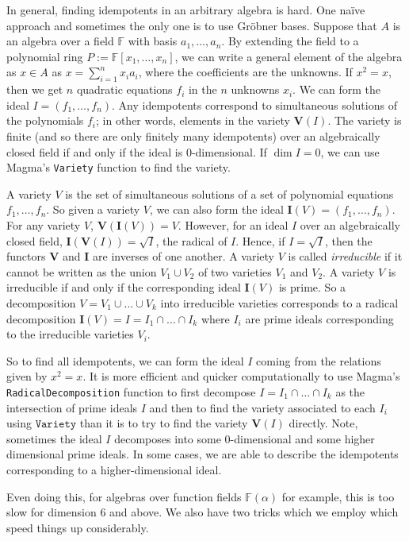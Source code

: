 \documentclass[11pt, a4paper]{article}
\theoremstyle{plain}
\theoremstyle{definition}
\newcommand\al{\alpha}
\newcommand\FF{\mathbb{F}}
\newcommand{\0}{\overline{0}}
\newcommand{\2}{\overline{2}}
\newcommand{\1}{\mathbbm{1}}
\newcommand{\V}{\mathbf{V}}
\newcommand{\I}{\mathbf{I}}
\begin{document}
In general, finding idempotents in an arbitrary algebra is hard.  One na\"ive approach and sometimes the only one is to use Gr\"obner bases.  Suppose that $A$ is an algebra over a field $\FF$ with basis $a_1, \dots, a_n$.  By extending the field to a polynomial ring $P := \FF[x_1, \dots, x_n]$, we can write a general element of the algebra as $x \in A$ as $x = \sum_{i=1}^n x_i a_i$, where the coefficients are the unknowns.  If $x^2 = x$, then we get $n$ quadratic equations $f_i$ in the $n$ unknowns $x_i$.  We can form the ideal $I = (f_1, \dots, f_n)$.  Any idempotents correspond to simultaneous solutions of the polynomials $f_i$; in other words, elements in the variety $\V(I)$.  The variety is finite (and so there are only finitely many idempotents) over an algebraically closed field if and only if the ideal is $0$-dimensional.  If $\dim I = 0$, we can use Magma's \texttt{Variety} function to find the variety.

A variety $V$ is the set of simultaneous solutions of a set of polynomial equations $f_1, \dots, f_n$.  So given a variety $V$, we can also form the ideal $\I(V) = (f_1, \dots, f_n)$.  For any variety $V$, $\V(\I(V)) = V$.  However, for an ideal $I$ over an algebraically closed field, $\I(\V(I)) = \sqrt{I}$, the radical of $I$.  Hence, if $I = \sqrt{I}$, then the functors $\V$ and $\I$ are inverses of one another.  A variety $V$ is called \emph{irreducible} if it cannot be written as the union $V_1 \cup V_2$ of two varieties $V_1$ and $V_2$.  A variety $V$ is irreducible if and only if the corresponding ideal $\I(V)$ is prime.  So a decomposition $V = V_1 \cup \dots \cup V_k$ into irreducible varieties corresponds to a radical decomposition $\I(V) = I =  I_1\cap \dots \cap I_k$ where $I_i$ are prime ideals corresponding to the irreducible varieties $V_i$.

So to find all idempotents, we can form the ideal $I$ coming from the relations given by $x^2 = x$.  It is more efficient and quicker computationally to use Magma's \texttt{RadicalDecomposition} function to first decompose $I = I_1 \cap \dots \cap I_k$ as the intersection of prime ideals $I$ and then to find the variety associated to each $I_i$ using $\texttt{Variety}$ than it is to try to find the variety $\V(I)$ directly.  Note, sometimes the ideal $I$ decomposes into some $0$-dimensional and some higher dimensional prime ideals.  In some cases, we are able to describe the idempotents corresponding to a higher-dimensional ideal.

Even doing this, for algebras over function fields $\FF(\al)$ for example, this is too slow for dimension $6$ and above.  We also have two tricks which we employ which speed things up considerably.
\end{document}
